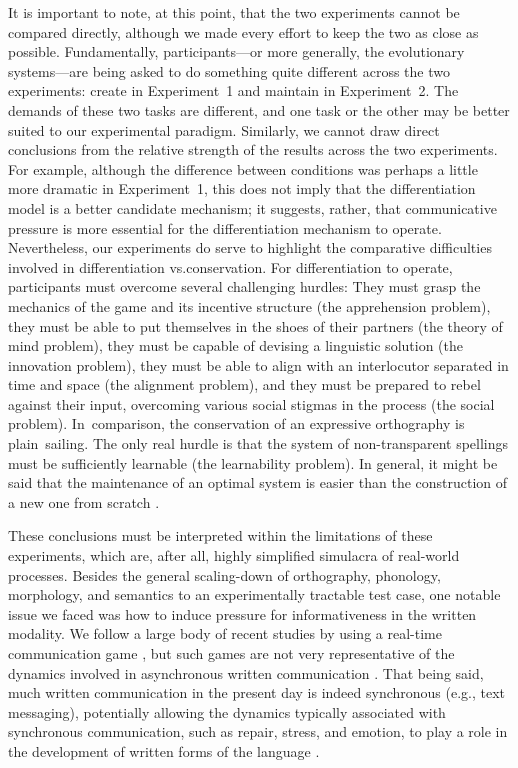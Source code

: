 \documentclass[doc,biblatex]{apa7}
\begin{document}
It is important to note, at this point, that the two experiments cannot be compared directly, although we made every effort to keep the two as close as possible. Fundamentally, participants---or more generally, the evolutionary systems---are being asked to do something quite different across the two experiments: create in Experiment~1 and maintain in Experiment~2. The demands of these two tasks are different, and one task or the other may be better suited to our experimental paradigm. Similarly, we cannot draw direct conclusions from the relative strength of the results across the two experiments. For example, although the difference between conditions was perhaps a little more dramatic in Experiment~1, this does not imply that the differentiation model is a better candidate mechanism; it suggests, rather, that communicative pressure is more essential for the differentiation mechanism to operate. Nevertheless, our experiments do serve to highlight the comparative difficulties involved in differentiation vs.\@ conservation. For differentiation to operate, participants must overcome several challenging hurdles: They must grasp the mechanics of the game and its incentive structure (the apprehension problem), they must be able to put themselves in the shoes of their partners (the theory of mind problem), they must be capable of devising a linguistic solution (the innovation problem), they must be able to align with an interlocutor separated in time and space (the alignment problem), and they must be prepared to rebel against their input, overcoming various social stigmas in the process (the social problem). In~comparison, the conservation of an expressive orthography is plain~sailing. The only real hurdle is that the system of non-transparent spellings must be sufficiently learnable (the learnability problem). In general, it might be said that the maintenance of an optimal system is easier than the construction of a new one from scratch \parencite[see also][]{Smith:2002}.

These conclusions must be interpreted within the limitations of these experiments, which are, after all, highly simplified simulacra of real-world processes. Besides the general scaling-down of orthography, phonology, morphology, and semantics to an experimentally tractable test case, one notable issue we faced was how to induce pressure for informativeness in the written modality. We follow a large body of recent studies by using a real-time communication game \parencite[e.g.,][]{Carr:2017, Kanwal:2017, Kirby:2015, Raviv:2018, Saldana:2019, Silvey:2019, Winters:2015}, but such games are not very representative of the dynamics involved in asynchronous written communication \parencite[although see][for some approaches]{Winters:2019}. That being said, much written communication in the present day is indeed synchronous (e.g., text messaging), potentially allowing the dynamics typically associated with synchronous communication, such as repair, stress, and emotion, to play a role in the development of written forms of the language \parencite{Lupyan:2016}.
\end{document}
